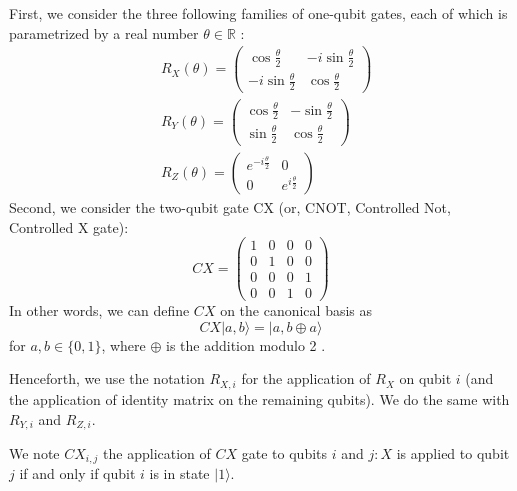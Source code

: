 \begin{example}
First, we consider the three following families of one-qubit gates, each of which is parametrized by a real number $\theta \in \mathbb{R}$ :
\begin{align*}
& R_{X}(\theta)=\left(\begin{array}{cc}
\cos \frac{\theta}{2} & -i \sin \frac{\theta}{2} \\
-i \sin \frac{\theta}{2} & \cos \frac{\theta}{2}
\end{array}\right)  \tag{5}\\
& R_{Y}(\theta)=\left(\begin{array}{cc}
\cos \frac{\theta}{2} & -\sin \frac{\theta}{2} \\
\sin \frac{\theta}{2} & \cos \frac{\theta}{2}
\end{array}\right)  \tag{6}\\
& R_{Z}(\theta)=\left(\begin{array}{cc}
e^{-i \frac{\theta}{2}} & 0 \\
0 & e^{i \frac{\theta}{2}}
\end{array}\right) \tag{7}
\end{align*}
 Second, we consider the two-qubit gate CX (or, CNOT, Controlled Not, Controlled X gate):
\[
C X=\left(\begin{array}{llll}
1 & 0 & 0 & 0  \tag{8}\\
0 & 1 & 0 & 0 \\
0 & 0 & 0 & 1 \\
0 & 0 & 1 & 0
\end{array}\right)
\]
In other words, we can define $C X$ on the canonical basis as
$$
C X|a, b\rangle=|a, b \oplus a\rangle
$$
for $a, b \in\{0,1\}$, where $\oplus$ is the addition modulo 2 .
\end{example}

\begin{remark}%
Henceforth, we use the notation $R_{X, i}$ for the application of $R_{X}$ on qubit $i$ (and the application of identity matrix on the remaining qubits). We do the same with $R_{Y, i}$ and $R_{Z, i}$. 

We note $C X_{i, j}$ the application of $C X$ gate to qubits $i$ and $j: X$ is applied to qubit $j$ if and only if qubit $i$ is in state $|1\rangle$.
\end{remark}

